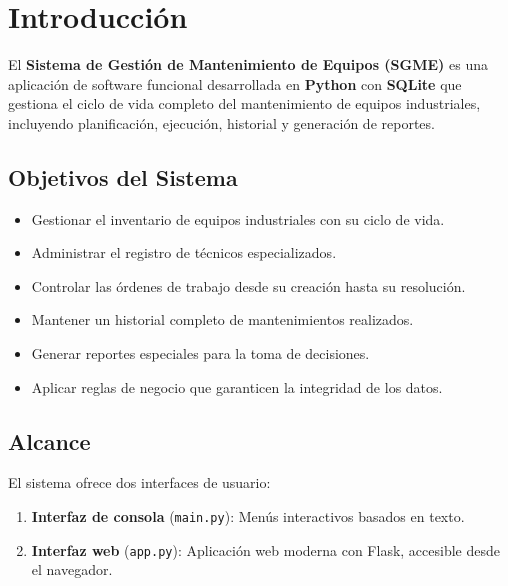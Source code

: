 \documentclass[12pt, a4paper]{article}
\begin{document}
\tableofcontents
\newpage

\section{Introducción}

El \textbf{Sistema de Gestión de Mantenimiento de Equipos (SGME)} es una aplicación de software funcional desarrollada en \textbf{Python} con \textbf{SQLite} que gestiona el ciclo de vida completo del mantenimiento de equipos industriales, incluyendo planificación, ejecución, historial y generación de reportes.

\subsection{Objetivos del Sistema}

\begin{itemize}[leftmargin=2em]
    \item Gestionar el inventario de equipos industriales con su ciclo de vida.
    \item Administrar el registro de técnicos especializados.
    \item Controlar las órdenes de trabajo desde su creación hasta su resolución.
    \item Mantener un historial completo de mantenimientos realizados.
    \item Generar reportes especiales para la toma de decisiones.
    \item Aplicar reglas de negocio que garanticen la integridad de los datos.
\end{itemize}

\subsection{Alcance}

El sistema ofrece dos interfaces de usuario:
\begin{enumerate}[leftmargin=2em]
    \item \textbf{Interfaz de consola} (\texttt{main.py}): Menús interactivos basados en texto.
    \item \textbf{Interfaz web} (\texttt{app.py}): Aplicación web moderna con Flask, accesible desde el navegador.
\end{enumerate}
\end{document}
